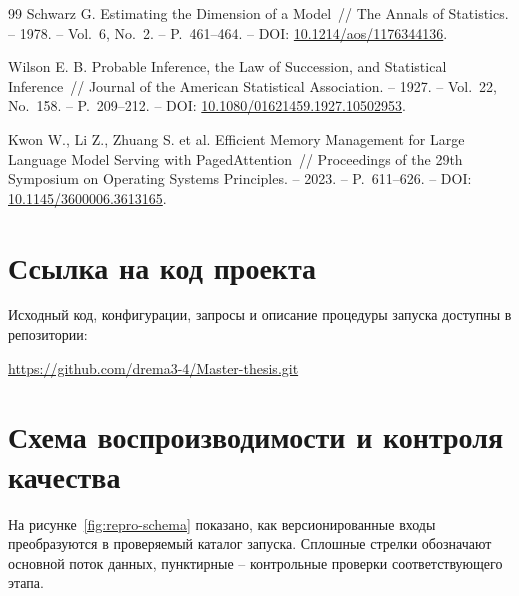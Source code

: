 \documentclass[a4paper,14pt]{extarticle}
\begin{document}
\begin{thebibliography}{99}
Schwarz G. Estimating the Dimension of a Model~// The Annals of Statistics. -- 1978. -- Vol.~6, No.~2. -- P.~461--464. -- DOI: \href{https://doi.org/10.1214/aos/1176344136}{10.1214/aos/1176344136}.

Wilson E. B. Probable Inference, the Law of Succession, and Statistical Inference~// Journal of the American Statistical Association. -- 1927. -- Vol.~22, No.~158. -- P.~209--212. -- DOI: \href{https://doi.org/10.1080/01621459.1927.10502953}{10.1080/01621459.1927.10502953}.

Kwon W., Li Z., Zhuang S. et al. Efficient Memory Management for Large Language Model Serving with PagedAttention~// Proceedings of the 29th Symposium on Operating Systems Principles. -- 2023. -- P.~611--626. -- DOI: \href{https://doi.org/10.1145/3600006.3613165}{10.1145/3600006.3613165}.

\end{thebibliography}

\clearpage
\appendix

\section{Ссылка на код проекта}
\label{app:repository}

Исходный код, конфигурации, запросы и описание процедуры запуска доступны в репозитории:

\begin{center}
  \url{https://github.com/drema3-4/Master-thesis.git}
\end{center}

\clearpage
\section{Схема воспроизводимости и контроля качества}
\label{app:repro-schema}

На рисунке~\ref{fig:repro-schema} показано, как версионированные входы преобразуются в проверяемый каталог запуска. Сплошные стрелки обозначают основной поток данных, пунктирные -- контрольные проверки соответствующего этапа.
\end{document}
